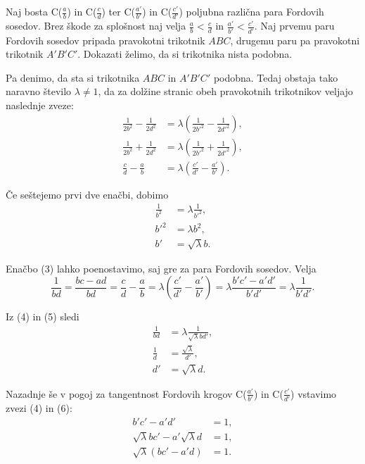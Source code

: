 \documentclass[mat1]{fmfdelo}
\begin{document}
\begin{dokaz}
%
Naj bosta C($\frac{a}{b}$) in C($\frac{c}{d}$) ter C($\frac{a'}{b'}$) in C($\frac{c'}{d'}$) poljubna različna para Fordovih sosedov. Brez škode za splošnost naj velja $\frac{a}{b}<\frac{c}{d}$ in $\frac{a'}{b'}<\frac{c'}{d'}$. Naj prvemu paru Fordovih sosedov pripada pravokotni trikotnik $ABC$, drugemu paru pa pravokotni trikotnik $A'B'C'$. Dokazati želimo, da si trikotnika nista podobna.

Pa denimo, da sta si trikotnika $ABC$ in $A'B'C'$ podobna. Tedaj obstaja tako naravno število $\lambda\ne{1}$, da za dolžine stranic obeh pravokotnih trikotnikov veljajo naslednje zveze:
%
\begin{align}
\frac{1}{2b^2}-\frac{1}{2d^2} &= \lambda \left (\frac{1}{2b'^2}-\frac{1}{2d'^2} \right ), \\
\frac{1}{2b^2}+\frac{1}{2d^2} &= \lambda \left (\frac{1}{2b'^2}+\frac{1}{2d'^2} \right ), \\
\frac{c}{d}-\frac{a}{b} &= \lambda \left (\frac{c'}{d'}-\frac{a'}{b'} \right ).
\end{align}

Če seštejemo prvi dve enačbi, dobimo
%
\begin{align}
\frac{1}{b^2} &= \lambda \frac{1}{b'^2}, \nonumber \\
b'^2 &= \lambda b^2, \nonumber \\
b' &= \sqrt\lambda b.
\end{align}

Enačbo (3) lahko poenostavimo, saj gre za para Fordovih sosedov. Velja
\begin{equation}
\frac{1}{bd} = \frac{bc-ad}{bd} = \frac{c}{d}-\frac{a}{b} = \lambda \left (\frac{c'}{d'}-\frac{a'}{b'} \right ) = \lambda \frac{b'c'-a'd'}{b'd'} = \lambda \frac{1}{b'd'}.
\end{equation}

Iz (4) in (5) sledi 
%
\begin{align}
\frac{1}{bd} &=\lambda \frac{1}{\sqrt\lambda bd'}, \nonumber \\
\frac{1}{d} &= \frac{\sqrt\lambda}{d'}, \nonumber \\
d' &= \sqrt\lambda d.
\end{align}

Nazadnje še v pogoj za tangentnost Fordovih krogov C($\frac{a'}{b'}$) in C($\frac{c'}{d'}$) vstavimo zvezi (4) in (6):
%
\begin{align}
b'c'-a'd' &= 1, \nonumber \\
\sqrt\lambda bc' - a' \sqrt\lambda d &= 1, \nonumber \\
\sqrt\lambda (bc'-a'd) &= 1.
\end{align}


\end{dokaz}
\end{document}

